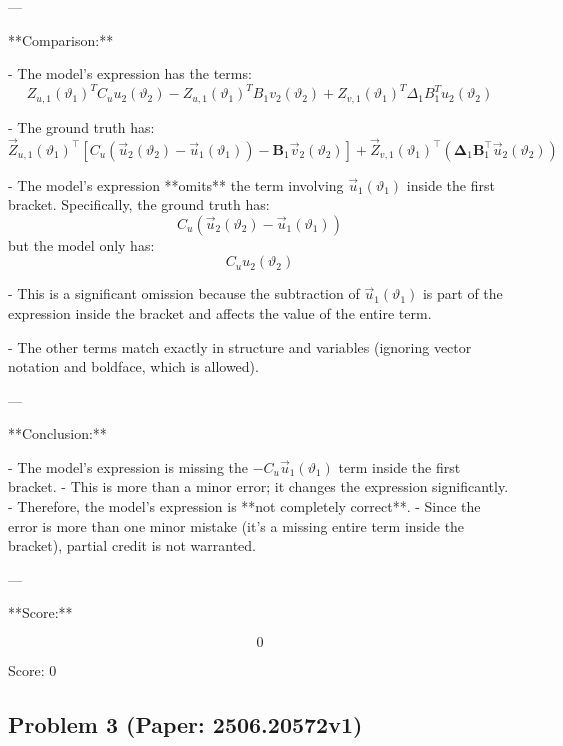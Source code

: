 \documentclass[10pt]{article}
\begin{document}
---

**Comparison:**

- The model's expression has the terms:
  \[
  Z_{u,1}(\vartheta_1)^T C_u u_2(\vartheta_2) - Z_{u,1}(\vartheta_1)^T B_1 v_2(\vartheta_2) + Z_{v,1}(\vartheta_1)^T \Delta_1 B_1^T u_2(\vartheta_2)
  \]

- The ground truth has:
  \[
  \vec{Z}_{u,1}(\vartheta_1)^\top \left[ C_u(\vec{u}_2(\vartheta_2) - \vec{u}_1(\vartheta_1)) - \boldsymbol{B}_1 \vec{v}_2(\vartheta_2) \right] + \vec{Z}_{v,1}(\vartheta_1)^\top \left( \boldsymbol{\Delta}_1 \boldsymbol{B}_1^\top \vec{u}_2(\vartheta_2) \right)
  \]

- The model's expression **omits** the term involving \(\vec{u}_1(\vartheta_1)\) inside the first bracket. Specifically, the ground truth has:
  \[
  C_u(\vec{u}_2(\vartheta_2) - \vec{u}_1(\vartheta_1))
  \]
  but the model only has:
  \[
  C_u u_2(\vartheta_2)
  \]

- This is a significant omission because the subtraction of \(\vec{u}_1(\vartheta_1)\) is part of the expression inside the bracket and affects the value of the entire term.

- The other terms match exactly in structure and variables (ignoring vector notation and boldface, which is allowed).

---

**Conclusion:**

- The model's expression is missing the \(- C_u \vec{u}_1(\vartheta_1)\) term inside the first bracket.
- This is more than a minor error; it changes the expression significantly.
- Therefore, the model's expression is **not completely correct**.
- Since the error is more than one minor mistake (it's a missing entire term inside the bracket), partial credit is not warranted.

---

**Score:**

\[
\boxed{0}
\]

Score: 0

\newpage
\subsection*{Problem 3 (Paper: 2506.20572v1)}
\end{document}
